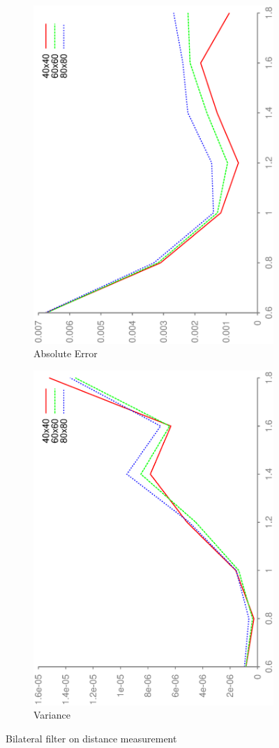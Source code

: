 \documentclass[DIV12,a4paper]{scrartcl}
\begin{document}
\begin{figure}[h!tbp]
  \centering
  \begin{subfigure}[b]{.5\textwidth}
    \centering
    \includegraphics[height=\textwidth, angle=270]{figures/mean_bilat_error.eps}
    \caption{Absolute Error}
  \end{subfigure}%
  \begin{subfigure}[b]{.5\textwidth}
    \centering
    \includegraphics[height=\textwidth, angle=270]{figures/mean_bilat_variance.eps}
    \caption{Variance}
  \end{subfigure}
  \caption{Bilateral filter on distance measurement}
  \label{fig:bilateral_noise}
\end{figure} 
\end{document}
